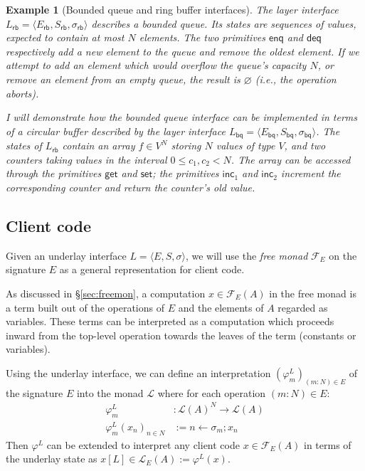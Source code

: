 \documentclass[draft,11pt]{report}
\newtheorem{example}[theorem]{Example}
\theoremstyle{definition}
\newcommand{\kw}[1]{\ensuremath{ \mathsf{#1} }}
\begin{document}
\begin{example}[Bounded queue and ring buffer interfaces] %
The layer interface
$L_\kw{rb} = \langle E_\kw{rb}, S_\kw{rb}, \sigma_\kw{rb} \rangle$
describes a bounded queue.
Its states are sequences of values,
expected to contain at most $N$ elements.
The two primitives
$\kw{enq}$ and $\kw{deq}$
respectively add a new element to the queue
and remove the oldest element.
If we attempt to add an element
which would overflow the queue's capacity $N$,
or remove an element from an empty queue,
the result is $\varnothing$ (i.e., the operation aborts).

I will demonstrate how the bounded queue interface
can be implemented in terms of a circular buffer
described by the layer interface
$L_\kw{bq} = \langle E_\kw{bq}, S_\kw{bq}, \sigma_\kw{bq} \rangle$.
The states of $L_\kw{rb}$
contain an array $f \in V^N$
storing $N$ values of type $V$,
and two counters
taking values in the interval $0 \le c_1, c_2 < N$.
The array can be accessed through the primitives
$\kw{get}$ and $\kw{set}$;
the primitives $\kw{inc}_1$ and $\kw{inc}_2$
increment the corresponding counter
and return the counter's old value.
\end{example}


\subsection{Client code} %

Given an underlay interface $L = \langle E, S, \sigma \rangle$,
we will use the \emph{free monad} $\mathcal{F}_E$ on the signature $E$
as a general representation for client code.

As discussed in \S\ref{sec:freemon},
a computation $x \in \mathcal{F}_E(A)$ in the free monad
is a term built out of the operations of $E$ and
the elements of $A$ regarded as variables.
These terms can be interpreted as a computation which proceeds inward
from the top-level operation
towards the leaves of the term (constants or variables).

Using the underlay interface,
we can define an interpretation
$(\varphi^L_m)_{(m:N) \in E}$
of the signature $E$ into the monad $\mathcal{L}$
where for each operation $(m:N) \in E$:
\begin{align*}
  \varphi^L_m &: \mathcal{L}(A)^N \rightarrow \mathcal{L}(A) \\
  \varphi^L_m(x_n)_{n \in N} &:=
    n \mathop{\leftarrow} \sigma_m \mathop{;} x_n
\end{align*}
Then $\varphi^L$ can be extended to
interpret any client code $x \in \mathcal{F}_E(A)$
in terms of the underlay state
as $x[L] \in \mathcal{L}_E(A) := \varphi^L(x)$.
\end{document}
